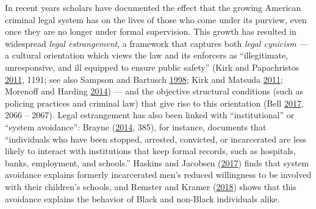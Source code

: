 \documentclass[
  12pt,
]{article}
\begin{document}
In recent years scholars have documented the effect that the growing American criminal legal system has on the lives of those who come under its purview, even once they are no longer under formal supervision. This growth has resulted in widespread \emph{legal estrangement}, a framework that captures both \emph{legal cynicism} --- a cultural orientation which views the law and its enforcers as ``illegitimate, unresponsive, and ill equipped to ensure public safety'' (Kirk and Papachristos \protect\hyperlink{ref-Kirk2011a}{2011}, 1191; see also Sampson and Bartusch \protect\hyperlink{ref-Sampson1998}{1998}; Kirk and Matsuda \protect\hyperlink{ref-Kirk2011}{2011}; Morenoff and Harding \protect\hyperlink{ref-Morenoff2014}{2014}) --- and the objective structural conditions (such as policing practices and criminal law) that give rise to this orientation (Bell \protect\hyperlink{ref-Bell2017}{2017}, 2066 -- 2067). Legal estrangement has also been linked with ``institutional'' or ``system avoidance'': Brayne (\protect\hyperlink{ref-Brayne2014}{2014}, 385), for instance, documents that ``individuals who have been stopped, arrested, convicted, or incarcerated are less likely to interact with institutions that keep formal records, such as hospitals, banks, employment, and schools.'' Haskins and Jacobsen (\protect\hyperlink{ref-Haskins2017}{2017}) finds that system avoidance explains formerly incarcerated men's reduced willingness to be involved with their children's schools, and Remster and Kramer (\protect\hyperlink{ref-Remster2018}{2018}) shows that this avoidance explains the behavior of Black and non-Black individuals alike.
\end{document}
